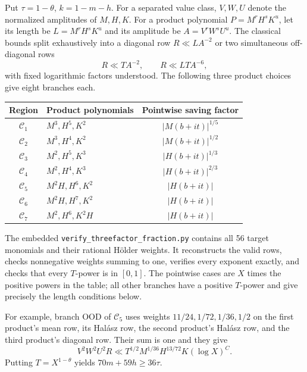 Put $\tau=1-\theta$, $k=1-m-h$. For a separated value class,
$V,W,U$ denote the normalized amplitudes of $M,H,K$.
For a product polynomial $P=M^rH^sK^u$, let its length be
$L=M^rH^sK^u$ and its amplitude be $A=V^rW^sU^u$.
The classical bounds split exhaustively into a diagonal row
$R\ll LA^{-2}$ or two simultaneous off-diagonal rows
\[
                   R\ll TA^{-2},\qquad R\ll LTA^{-6},
\]
with fixed logarithmic factors understood. The following three
product choices give eight branches each.
\begin{center}
\begin{tabular}{@{}clc@{}}
\toprule
Region & Product polynomials & Pointwise saving factor\\
\midrule
$\mathcal C_1$ & $M^3,H^5,K^2$ & $|M(b+it)|^{1/5}$\\
$\mathcal C_2$ & $M^3,H^4,K^2$ & $|M(b+it)|^{1/2}$\\
$\mathcal C_3$ & $M^2,H^5,K^3$ & $|H(b+it)|^{1/3}$\\
$\mathcal C_4$ & $M^2,H^4,K^3$ & $|H(b+it)|^{2/3}$\\
$\mathcal C_5$ & $M^2H,H^6,K^2$ & $|H(b+it)|$\\
$\mathcal C_6$ & $M^2H,H^7,K^2$ & $|H(b+it)|$\\
$\mathcal C_7$ & $M^2,H^6,K^2H$ & $|H(b+it)|$\\
\bottomrule
\end{tabular}
\end{center}

The embedded \texttt{verify\_threefactor\_fraction.py} contains all
56 target monomials and their rational H\"older weights.
It reconstructs the valid rows, checks nonnegative weights summing
to one, verifies every exponent exactly, and checks that every
$T$-power is in $[0,1]$. The pointwise cases are $X$ times the
positive powers in the table; all other branches have a positive
$T$-power and give precisely the length conditions below.

For example, branch OOD of $\mathcal C_5$ uses weights
$11/24,1/72,1/36,1/2$ on the first product's mean row, its
Hal\'asz row, the second product's Hal\'asz row, and the third
product's diagonal row. Their sum is one and they give
\[
 V^2W^2U^2R\ll T^{1/2}M^{1/36}H^{13/72}K(\log X)^C.
\]
Putting $T=X^{1-\theta}$ yields $70m+59h\ge36\tau$.


